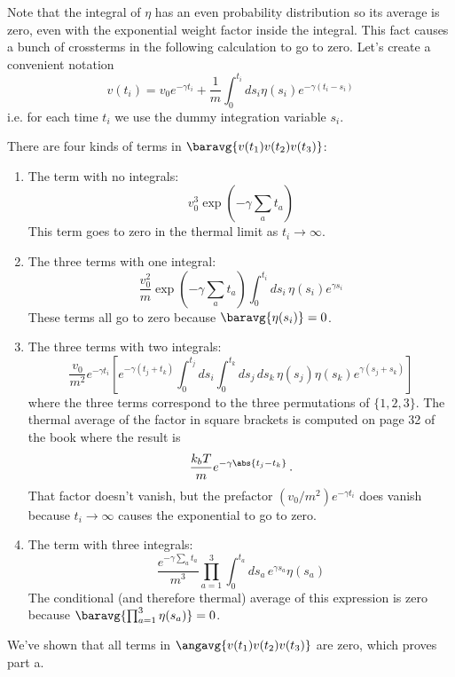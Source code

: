 Note that the integral of $\eta$ has an even probability distribution so its average is zero, even with the exponential weight factor inside the integral.
This fact causes a bunch of crossterms in the following calculation to go to zero.
Let's create a convenient notation
\begin{equation*}
  v(t_i) = v_0 e^{-\gamma t_i} + \frac{1}{m} \int_0^{t_i} ds_i \eta(s_i) e^{-\gamma(t_i - s_i)}
\end{equation*}
i.e. for each time $t_i$ we use the dummy integration variable $s_i$.

There are four kinds of terms in $\baravg{v(t_1) v(t_2) v(t_3)}$:
\begin{enumerate}[1.]
  \item The term with no integrals:
    \begin{equation*}
      v_0^3 \exp \left( -\gamma \sum_a t_a \right)
    \end{equation*}
    This term goes to zero in the thermal limit as $t_i \rightarrow \infty$.
  \item The three terms with one integral:
    \begin{equation*}
      \frac{v_0^2}{m} \exp \left(-\gamma \sum_a t_a \right) \int_0^{t_i} ds_i \, \eta(s_i) e^{\gamma s_i}
    \end{equation*}
    These terms all go to zero because $\baravg{\eta(s_i)} = 0$.
  \item The three terms with two integrals:
    \begin{equation*}
	    \frac{v_0}{m^2} e^{-\gamma t_i} \left[ e^{-\gamma (t_j + t_k)} \int_0^{t_j} ds_i \int_0^{t_k} ds_j \, ds_k \,  \eta(s_j) \eta(s_k) e^{\gamma (s_j + s_k)} \right]
    \end{equation*}
    where the three terms correspond to the three permutations of $\{1, 2, 3 \}$.
    The thermal average of the factor in square brackets is computed on page 32 of the book where the result is
    \begin{equation*}
      \frac{k_b T}{m} e^{-\gamma \abs{t_j - t_k}} \, .
    \end{equation*}
    That factor doesn't vanish, but the prefactor $(v_0 / m^2) e^{-\gamma t_i}$ does vanish because $t_i \rightarrow \infty$ causes the exponential to go to zero.
  \item The term with three integrals:
    \begin{equation*}
      \frac{e^{-\gamma \sum_a t_a}}{m^3} \prod_{a=1}^3 \int_0^{t_a} ds_a \, e^{\gamma s_a} \eta(s_a)
    \end{equation*}
		The conditional (and therefore thermal) average of this expression is zero because $\baravg{\prod_{a=1}^3 \eta(s_a)} = 0$.
\end{enumerate}
We've shown that all terms in $\angavg{v(t_1) v(t_2) v(t_3)}$ are zero, which proves part a.

